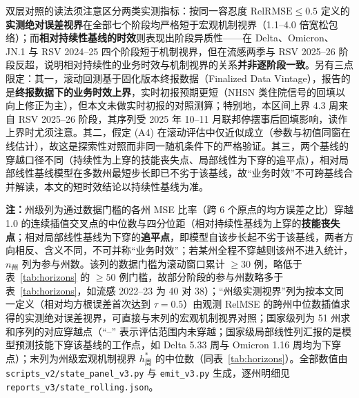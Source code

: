 \documentclass[10pt,a4paper]{article}
\theoremstyle{plain}
\theoremstyle{definition}
\begin{document}
双层对照的读法须注意区分两类实测指标：按同一容忍度 $\text{RelRMSE} \le 0.5$ 定义的\textbf{实测绝对误差视界}在全部七个阶段均严格短于宏观机制视界（1.1--4.0 倍宽松包络）；而\textbf{相对持续性基线的时效}则表现出阶段异质性——在 Delta、Omicron、JN.1 与 RSV 2024--25 四个阶段短于机制视界，但在流感两季与 RSV 2025--26 阶段反超，说明相对持续性的业务时效与机制视界的关系\textbf{并非逐阶段一致}。另有三点限定：其一，滚动回测基于固化版本终报数据（Finalized Data Vintage），报告的是\textbf{终报数据下的业务时效上界}，实时初报预期更短（NHSN 类住院信号的回填以向上修正为主），但本文未做实时初报的对照测算；特别地，本区间上界 4.3 周来自 RSV 2025--26 阶段，其序列受 2025 年 10--11 月联邦停摆事后回填影响，读作上界时尤须注意。其二，假定 (A4) 在滚动评估中仅近似成立（参数与初值同窗在线估计），故这是探索性对照而非同一随机条件下的严格验证。其三，两个基线的穿越口径不同（持续性为上穿的技能丧失点、局部线性为下穿的追平点），相对局部线性基线模型在多数州最短步长即已不劣于该基线，故“业务时效”不可跨基线合并解读，本文的短时效结论以持续性基线为准。

\begin{table}[htbp]
\centering
\footnotesize
\caption{宏观机制视界与伪实时滚动业务时效的州级双层对照}
\label{tab:rolling}
\resizebox{\textwidth}{!}{%
%
}
\vspace{2pt}
\begin{flushleft}
\scriptsize \textbf{注：}州级列为通过数据门槛的各州 MSE 比率（跨 6 个原点的均方误差之比）穿越 1.0 的连续插值交叉点的中位数与四分位距（相对持续性基线为上穿的\textbf{技能丧失点}；相对局部线性基线为下穿的\textbf{追平点}，即模型自该步长起不劣于该基线，两者方向相反、含义不同，不可并称“业务时效”；若某州全程不穿越则该州不进入统计，$n_{\text{州}}$ 列为参与州数。该列的数据门槛为滚动窗口累计 $\ge 30$ 例，略低于表~\ref{tab:horizons} 的 $\ge 50$ 例门槛，故部分阶段的参与州数略多于表~\ref{tab:horizons}，如流感 2022--23 为 40 对 38）；``州级实测视界''列为按本文同一定义（相对均方根误差首次达到 $\tau=0.5$）由观测 RelMSE 的跨州中位数插值求得的实测绝对误差视界，可直接与末列的宏观机制视界对照；国家级列为 51 州求和序列的对应穿越点（``--'' 表示评估范围内未穿越；国家级局部线性列汇报的是模型预测技能下穿该基线的工作点，如 Delta 5.33 周与 Omicron 1.16 周均为下穿点）；末列为州级宏观机制视界 $h^*_{\text{周}}$ 的中位数（同表~\ref{tab:horizons}）。全部数值由 \texttt{scripts\_v2/state\_panel\_v3.py} 与 \texttt{emit\_v3.py} 生成，逐州明细见 \texttt{reports\_v3/state\_rolling.json}。\end{flushleft}
\end{table}
\end{document}

